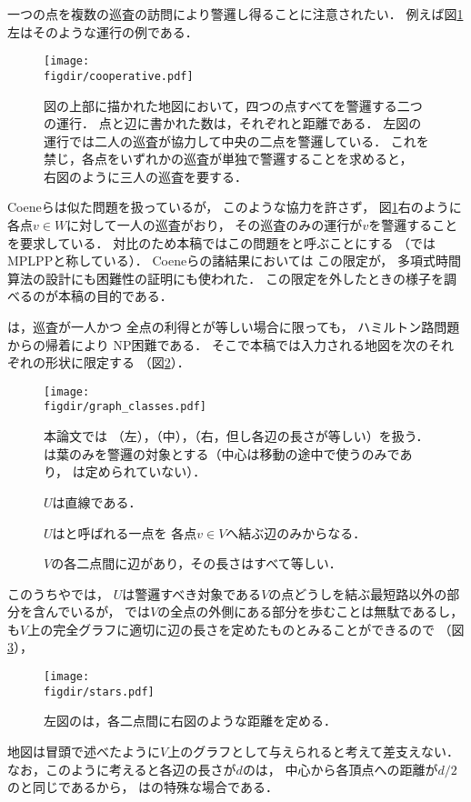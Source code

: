 一つの点を複数の巡査の訪問により警邏し得ることに注意されたい．
例えば図\ref{figure: cooperative}左はそのような運行の例である．
\begin{figure}
  \centering
  \texttt{[image: \\figdir/cooperative.pdf]}
  \caption{図の上部に描かれた地図において，四つの点すべてを警邏する二つの運行．
    点と辺に書かれた数は，それぞれ{\maxIdletime}と距離である．
    左図の運行では二人の巡査が協力して中央の二点を警邏している．
    これを禁じ，各点をいずれかの巡査が単独で警邏することを求めると，
    右図のように三人の巡査を要する．}
  \label{figure: cooperative}
\end{figure}
Coeneら\cite{coene2011charlemagne}は似た問題を扱っているが，
このような協力を許さず，
図\ref{figure: cooperative}右のように
各点$v \in W$に対して一人の巡査がおり，
その巡査のみの運行が$v$を警邏することを要求している．
対比のため本稿ではこの問題をと呼ぶことにする
（\cite{coene2011charlemagne}ではMPLPPと称している）．
Coeneら\cite{coene2011charlemagne}の諸結果においては
この限定が，
多項式時間算法の設計にも困難性の証明にも使われた．
この限定を外したときの様子を調べるのが本稿の目的である．

{\patProb}は，巡査が一人かつ
全点の利得と{\maxIdletime}が等しい場合に限っても，
ハミルトン路問題からの帰着により
NP困難である\cite[Theorem~8]{coene2011charlemagne}．
そこで本稿では入力される地図を次のそれぞれの形状に限定する
（図\ref{figure: graph_classes}）．
\begin{figure}
  \centering
  \texttt{[image: \\figdir/graph\_classes.pdf]}
  \caption{本論文では
    {\graphLine}（左），{\graphStar}（中），{\graphUnit}（右，但し各辺の長さが等しい）を扱う．
    {\graphStar}は葉のみを警邏の対象とする（中心は移動の途中で使うのみであり，
    {\maxIdletime}は定められていない）．}
  \label{figure: graph_classes}
\end{figure}
\begin{description}
\item[{\graphLine}]
  $U$は直線である．
\item[{\graphStar}]
  $U$はと呼ばれる一点を
  各点$v \in V$へ結ぶ辺のみからなる．
\item[{\graphUnit}]
  $V$の各二点間に辺があり，その長さはすべて等しい．
\end{description}
このうち{\graphLine}や{\graphStar}では，
$U$は警邏すべき対象である$V$の点どうしを結ぶ最短路以外の部分を含んでいるが，
{\graphLine}では$V$の全点の外側にある部分を歩むことは無駄であるし，
{\graphStar}も$V$上の完全グラフに適切に辺の長さを定めたものとみることができるので
（図\ref{figure: stars}），
\begin{figure}
  \centering
  \texttt{[image: \\figdir/stars.pdf]}
  \caption{左図の{\graphStar}は，各二点間に右図のような距離を定める．}
  \label{figure: stars}
\end{figure}
地図は冒頭で述べたように$V$上のグラフとして与えられると考えて差支えない．
なお，このように考えると各辺の長さが$d$の{\graphUnit}は，
中心から各頂点への距離が$d/2$の{\graphStar}と同じであるから，
{\graphUnit}は{\graphStar}の特殊な場合である．

